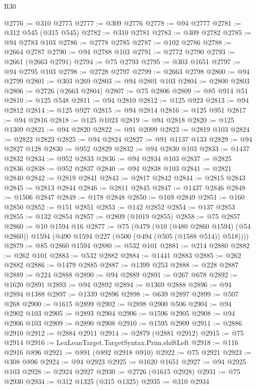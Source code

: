 \begin{lexlean}{R30}
\begin{coremodule}
@2776 := @310 @2775
@2777 := @309 @2776
@2778 := @94 @2777
@2781 := @312 @545 (@315 @545)
@2782 := @310 @2781
@2783 := @309 @2782
@2785 := @94 @2783 @103
@2786 := @2778 @2785
@2787 := @102 @2786
@2788 := @2664 @2787
@2790 := @94 @2788 @103
@2791 := @2772 @2790
@2793 := @2661 (@2663 @2791)
@2794 := @75 @2793
@2795 := @303 @1651
@2797 := @94 @2795 @103
@2798 := @2728 @2797
@2799 := @2663 @2798
@2800 := @94 @2799
@2801 := @303 @269
@2803 := @94 @2801 @103
@2804 := @2800 @2803
@2806 := @2726 (@2663 @2804)
@2807 := @75 @2806
@2809 := @85 @914 @51
@2810 := @125 @548
@2811 := @94 @2810
@2812 := @125 @923
@2813 := @94 @2812
@2814 := @125 @927
@2815 := @94 @2814
@2816 := @125 @951
@2817 := @94 @2816
@2818 := @125 @1023
@2819 := @94 @2818
@2820 := @125 @1309
@2821 := @94 @2820
@2822 := @91 @2099
@2823 := @2819 @103
@2824 := @2822 @2823
@2825 := @94 @2824
@2827 := @91 @1137 @133
@2829 := @94 @2827 @128
@2830 := @952 @2829
@2832 := @94 @2830 @103
@2833 := @1437 @2832
@2834 := @952 @2833
@2836 := @94 @2834 @103
@2837 := @2825 @2836
@2838 := @952 @2837
@2840 := @94 @2838 @103
@2841 := @2821 @2840
@2842 := @2819 @2841
@2843 := @2817 @2842
@2844 := @2815 @2843
@2845 := @2813 @2844
@2846 := @2811 @2845
@2847 := @1437 @2846
@2848 := @1506 @2847
@2849 := @178 @2848
@2850 := @169 @2849
@2851 := @160 @2850
@2852 := @151 @2851
@2853 := @142 @2852
@2854 := @137 @2853
@2855 := @132 @2854
@2857 := @2809 (@1019 @2855)
@2858 := @75 @2857
@2860 := @10 @1594 @16
@2877 := @75
    (@479
      (@10 (@480 @2860 @1594) (@54 @2860))
      @1594
      (@490 @1594 @227 (@500 (@494 (@505 (@1588 @514)) @518))))
@2879 := @85 @2860 @1594
@2880 := @532 @101
@2881 := @214 @2880
@2882 := @262 @101
@2883 := @532 @2882
@2884 := @1441 @2883
@2885 := @262 @2882
@2886 := @1479 @2885
@2887 := @1399 @253
@2888 := @228 @2887
@2889 := @224 @2888
@2890 := @94 @2889
@2891 := @267 @678
@2892 := @1620 @2891
@2893 := @94 @2892
@2894 := @1369 @2888
@2896 := @94 @2894 @1388
@2897 := @1339 @2896
@2898 := @639 @2897
@2899 := @507 @268
@2900 := @1615 @2899
@2902 := @2898 @2900 @506
@2904 := @94 @2902 @103
@2905 := @2893 @2904
@2906 := @1596 @2905
@2908 := @94 @2906 @103
@2909 := @2890 @2908
@2910 := @1595 @2909
@2911 := @2886 @2910
@2912 := @2884 @2911
@2914 := @2879 (@2881 @2912)
@2915 := @75 @2914
@2916 := LexLeanTarget.TargetSyntax.Prim.shiftLeft
@2918 := @116 @2916 @896
@2921 := @891 (@892 @2918 @910)
@2922 := @75 @2921
@2923 := @308 @896
@2924 := @94 @2923
@2925 := @1620 @1651
@2927 := @94 @2925 @103
@2928 := @2924 @2927
@2930 := @2726 (@1615 @2928)
@2931 := @75 @2930
@2934 := @312 @1325 (@315 @1325)
@2935 := @310 @2934

\end{coremodule}
\end{lexlean}
